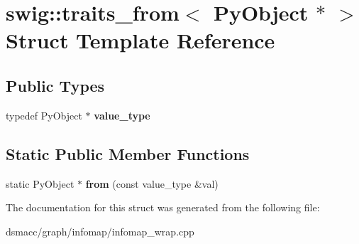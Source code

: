 \hypertarget{structswig_1_1traits__from_3_01PyObject_01_5_01_4}{}\section{swig\+:\+:traits\+\_\+from$<$ Py\+Object $\ast$ $>$ Struct Template Reference}
\label{structswig_1_1traits__from_3_01PyObject_01_5_01_4}
\subsection*{Public Types}
\begin{DoxyCompactItemize}
\item 
\mbox{\label{structswig_1_1traits__from_3_01PyObject_01_5_01_4_a3f736b20ca687eb0894c64d1b8ec2b11}} 
typedef Py\+Object $\ast$ {\bfseries value\+\_\+type}
\end{DoxyCompactItemize}
\subsection*{Static Public Member Functions}
\begin{DoxyCompactItemize}
\item 
\mbox{\label{structswig_1_1traits__from_3_01PyObject_01_5_01_4_ab383a520e9f35b0d778819da07efd42d}} 
static Py\+Object $\ast$ {\bfseries from} (const value\+\_\+type \&val)
\end{DoxyCompactItemize}


The documentation for this struct was generated from the following file\+:\begin{DoxyCompactItemize}
\item 
dsmacc/graph/infomap/infomap\+\_\+wrap.\+cpp\end{DoxyCompactItemize}
